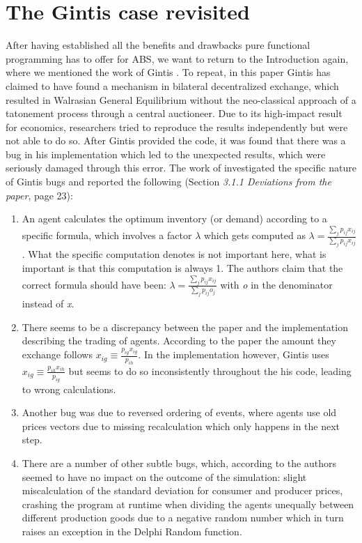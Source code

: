 \section{The Gintis case revisited}
\label{sec:gintis_case} 
After having established all the benefits and drawbacks pure functional programming has to offer for ABS, we want to return to the Introduction again, where we mentioned the work of Gintis \cite{gintis_emergence_2006}. To repeat, in this paper Gintis has claimed to have found a mechanism in bilateral decentralized exchange, which resulted in Walrasian General Equilibrium without the neo-classical approach of a tatonement process through a central auctioneer. Due to its high-impact result for economics, researchers \cite{ionescu_dependently-typed_2012} tried to reproduce the results independently but were not able to do so. After Gintis provided the code, it was found that there was a bug in his implementation which led to the unexpected results, which were seriously damaged through this error. The work of \cite{evensen_extensible_2010} investigated the specific nature of Gintis bugs and reported the following (Section \textit{3.1.1  Deviations from the paper}, page 23):

\begin{enumerate}
	\item An agent calculates the optimum inventory (or demand) according to a specific formula, which involves a factor $\lambda$ which gets computed as $\lambda = \frac{\sum_{j}{} p_{ij}x_{ij}}{\sum_{j}{} p_{ij}x_{ij}}$. What the specific computation denotes is not important here, what is important is that this computation is always 1. The authors \cite{evensen_extensible_2010} claim that the correct formula should have been: $\lambda = \frac{\sum_{j}{} p_{ij}x_{ij}}{\sum_{j}{} p_{ij}o_{j}}$ with \textit{o} in the denominator instead of \textit{x}. 
	
	\item There seems to be a discrepancy between the paper and the implementation describing the trading of agents. According to the paper the amount they exchange follows $x_{ig} \equiv \frac{p_{ig}x_{ig}}{p_{ih}}$. In the implementation however, Gintis uses $x_{ig} \equiv \frac{p_{ih}x_{ih}}{p_{ig}}$ but seems to do so inconsistently throughout the his code, leading to wrong calculations.
	
	\item Another bug was due to reversed ordering of events, where agents use old prices vectors due to missing recalculation which only happens in the next step.

	\item There are a number of other subtle bugs, which, according to the authors \cite{evensen_extensible_2010} seemed to have no impact on the outcome of the simulation: slight miscalculation of the standard deviation for consumer and producer prices, crashing the program at runtime when dividing the agents unequally between different production goods due to a negative random number which in turn raises an exception in the Delphi Random function.

\end{enumerate}

